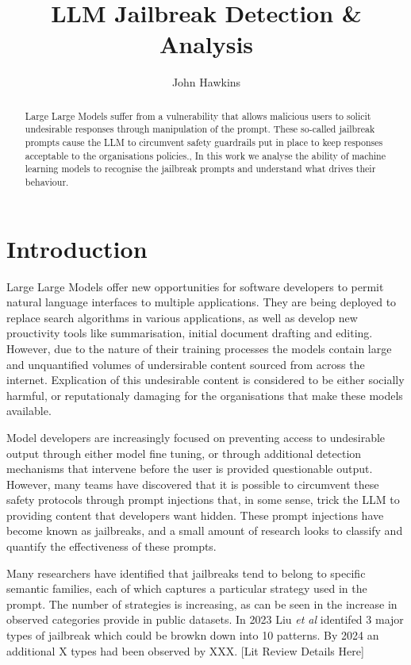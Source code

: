 \documentclass[12pt,a4paper]{article}
\begin{document}
\title{LLM Jailbreak Detection \& Analysis}

\author{John Hawkins}

\maketitle

\begin{abstract}
Large Large Models suffer from a vulnerability that allows malicious users
to solicit undesirable responses through manipulation of the prompt. These
so-called jailbreak prompts cause the LLM to circumvent safety guardrails put
in place to keep responses acceptable to the organisations policies.,
In this work we analyse the ability of machine learning models to recognise the
jailbreak prompts and understand what drives their behaviour.

\end{abstract}

\section{Introduction}

Large Large Models offer new opportunities for software developers to permit
natural language interfaces to multiple applications. They are being deployed
to replace search algorithms in various applications, as well as develop new 
prouctivity tools like summarisation, initial document drafting and editing. 
However, due to the nature of their training processes the models contain large 
and unquantified volumes of undersirable content sourced from across the internet. 
Explication of this undesirable content is considered
to be either socially harmful, or reputationaly damaging for the organisations
that make these models available.

Model developers are increasingly focused on preventing access to undesirable output
through either model fine tuning, or through additional detection mechanisms that
intervene before the user is provided questionable output. However, many teams have
discovered that it is possible to circumvent these safety protocols through prompt
injections that, in some sense, trick the LLM to providing content that developers
want hidden. These prompt injections have become known as jailbreaks, and a small
amount of research looks to classify and quantify the effectiveness of these prompts.

Many researchers have identified that jailbreaks tend to belong to specific semantic
families, each of which captures a particular strategy used in the prompt. The number
of strategies is increasing, as can be seen in the increase in observed categories 
provide in public datasets. In 2023 Liu \emph{et al} identifed 3 major types of
jailbreak which could be browkn down into 10 patterns\cite{Liu2023}. By 2024 
an additional X types had been observed by XXX. [Lit Review Details Here]
\end{document}
